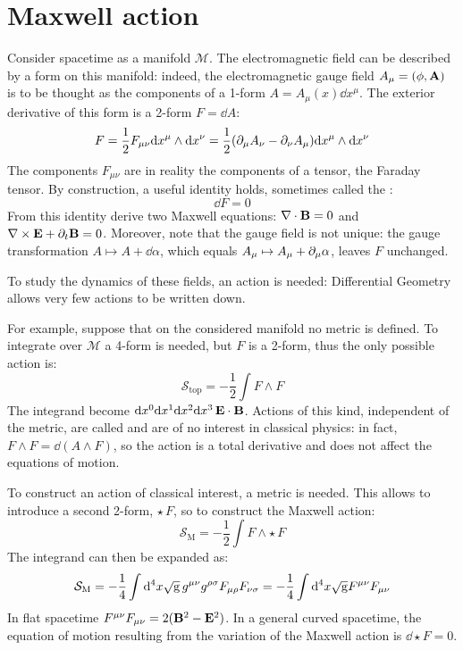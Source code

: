 
\section{Maxwell action}
\label{sec:maxwell}

Consider spacetime as a manifold $ \mathcal{M} $. The electromagnetic field can be described by a form on this manifold: indeed, the electromagnetic gauge field $ A_\mu = (\phi,\mathbf{A}) $ is to be thought as the components of a 1-form $ A = A_\mu(x) \dd x^\mu $. The exterior derivative of this form is a 2-form $ F = \dd A $:
\begin{equation*}
  F = \frac{1}{2} F_{\mu \nu} \mathrm{d} x^\mu \wedge \mathrm{d} x^\nu = \frac{1}{2} (\partial_\mu A_\nu - \partial_\nu A_\mu) \mathrm{d} x^\mu \wedge \mathrm{d} x^\nu
\end{equation*}
The components $ F_{\mu \nu} $ are in reality the components of a tensor, the Faraday tensor. By construction, a useful identity holds, sometimes called the :
\begin{equation}
  \dd F = 0
\end{equation}
From this identity derive two Maxwell equations: $ \nabla\cdot\mathbf{B} = 0 $ and $ \nabla\times\mathbf{E} + \partial_t \mathbf{B} = 0 $. Moreover, note that the gauge field is not unique: the gauge transformation $ A \mapsto A + \dd \alpha $, which equals $ A_\mu \mapsto A_\mu + \partial_\mu \alpha $, leaves $ F $ unchanged.

To study the dynamics of these fields, an action is needed: Differential Geometry allows very few actions to be written down.

For example, suppose that on the considered manifold no metric is defined. To integrate over $ \mathcal{M} $ a 4-form is needed, but $ F $ is a 2-form, thus the only possible action is:
\begin{equation}
  \mathcal{S}_{\text{top}} = - \frac{1}{2} \int F \wedge F
\end{equation}
The integrand become $ \mathrm{d} x^0 \mathrm{d} x^1 \mathrm{d} x^2 \mathrm{d} x^3 \, \mathbf{E}\cdot\mathbf{B} $. Actions of this kind, independent of the metric, are called  and are of no interest in classical physics: in fact, $ F \wedge F = \dd (A \wedge F) $, so the action is a total derivative and does not affect the equations of motion.

To construct an action of classical interest, a metric is needed. This allows to introduce a second 2-form, $ \star\, F $, so to construct the Maxwell action:
\begin{equation}
  \mathcal{S}_{\text{M}} = - \frac{1}{2} \int F \wedge \star\, F
  \label{eq:maxwell-action}
\end{equation}
The integrand can then be expanded as:
\begin{equation*}
  \mathcal{S}_{\text{M}} = - \frac{1}{4} \int \mathrm{d}^4 x \sqrt{\mathrm{g}}\, g^{\mu \nu} g^{\rho \sigma} F_{\mu \rho} F_{\nu \sigma} = - \frac{1}{4} \int \mathrm{d}^4 x \sqrt{\mathrm{g}} F^{\mu \nu} F_{\mu \nu}
\end{equation*}
In flat spacetime $ F^{\mu \nu} F_{\mu \nu} = 2 (\mathbf{B}^2 - \mathbf{E}^2) $. In a general curved spacetime, the equation of motion resulting from the variation of the Maxwell action is $ \dd \star F = 0 $.

